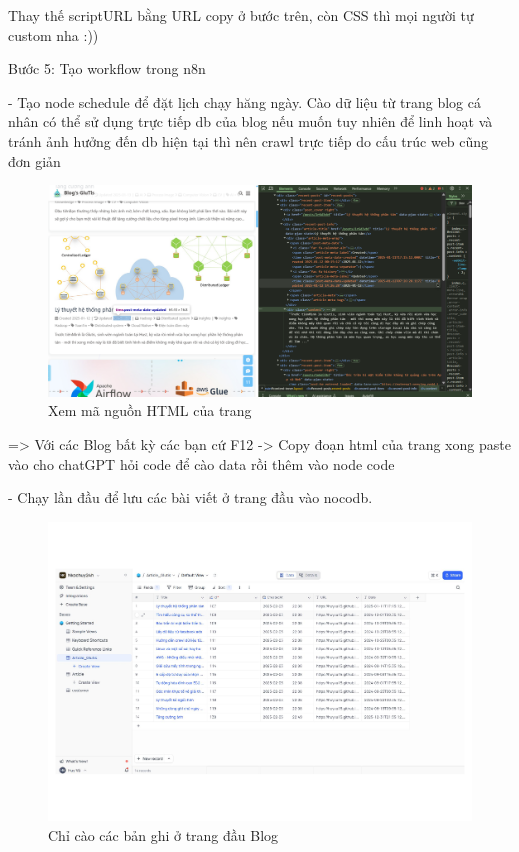 Thay thế scriptURL bằng URL copy ở bước trên, còn CSS thì mọi người tự custom nha :))

Bước 5: Tạo workflow trong n8n

- Tạo node schedule để đặt lịch chạy hăng ngày. Cào dữ liệu từ trang blog cá nhân có thể sử dụng trực tiếp db của blog nếu muốn tuy nhiên để linh hoạt và tránh ảnh hưởng đến db hiện tại thì nên crawl trực tiếp do cấu trúc web cũng đơn giản

\begin{figure}[htbp]
    \centering
    \includegraphics[width=1\linewidth]{Chap1-7/HTML_view.pdf}
    \caption{Xem mã nguồn HTML của trang}
\end{figure}

=> Với các Blog bất kỳ các bạn cứ F12 -> Copy đoạn html của trang xong paste vào cho chatGPT hỏi code để cào data rồi thêm vào node code

\newpage

- Chạy lần đầu để lưu các bài viết ở trang đầu vào nocodb.

\begin{figure}[htbp]
    \centering
    \includegraphics[width=1\linewidth]{Chap1-7/nocodb-article.pdf}
    \caption{Chỉ cào các bản ghi ở trang đầu Blog}
\end{figure}

